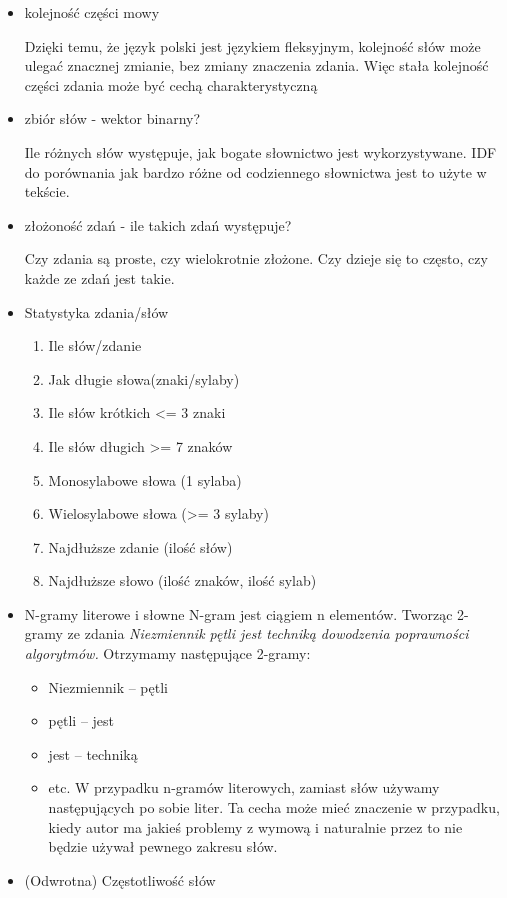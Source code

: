 \documentclass[a4paper,12pt,twoside,openany]{report}
\begin{document}
\begin{itemize}
\item kolejność części mowy

Dzięki temu, że język polski jest językiem fleksyjnym, kolejność słów może ulegać znacznej zmianie, bez zmiany znaczenia zdania. Więc stała kolejność części zdania może być cechą charakterystyczną

\item zbiór słów - wektor binarny?

Ile różnych słów występuje, jak bogate słownictwo jest wykorzystywane. IDF do porównania jak bardzo różne od codziennego słownictwa jest to użyte w tekście.
\item złożoność zdań - ile takich zdań występuje? 

Czy zdania są proste, czy wielokrotnie złożone. Czy dzieje się to często, czy każde ze zdań jest takie.
\item Statystyka zdania/słów
	\begin{enumerate}
	\item Ile słów/zdanie 
	\item Jak długie słowa(znaki/sylaby)
	\item Ile słów krótkich <= 3 znaki
	\item Ile słów długich >= 7 znaków
	\item Monosylabowe słowa (1 sylaba)
	\item Wielosylabowe słowa (>= 3 sylaby)
	\item Najdłuższe zdanie (ilość słów)
	\item Najdłuższe słowo (ilość znaków, ilość sylab)
	\end{enumerate}
\item N-gramy literowe i słowne
N-gram jest ciągiem n elementów. Tworząc 2-gramy ze zdania \textit{Niezmiennik pętli jest techniką dowodzenia poprawności algorytmów.} Otrzymamy następujące 2-gramy:
\begin{itemize}
	\item Niezmiennik -- pętli
	\item pętli -- jest
	\item jest -- techniką
	\item etc.
W przypadku n-gramów literowych, zamiast słów używamy następujących po sobie liter. Ta cecha może mieć znaczenie w przypadku, kiedy autor ma jakieś problemy z wymową i naturalnie przez to nie będzie używał pewnego zakresu słów. 
\end{itemize}
\item (Odwrotna) Częstotliwość słów


\end{itemize}
\end{document}
